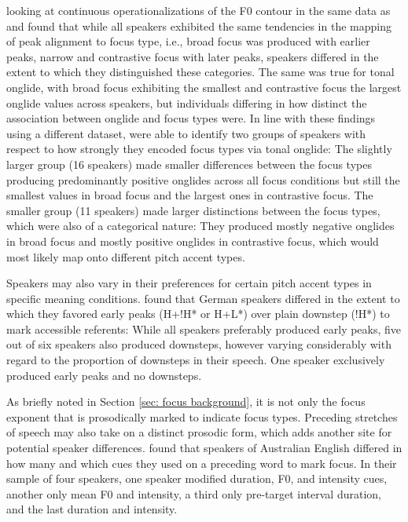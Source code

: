 \citet{griceIntegratingDiscretenessContinuity2017} looking at continuous operationalizations of the F0 contour in the same data as \citet{muckeEffectFocusMarking2014} and \citet{cangemiListenerSpecificPerceptionSpeakerSpecific2015} found that while all speakers exhibited the same tendencies in the mapping of peak alignment to focus type, i.e., broad focus was produced with earlier peaks, narrow and contrastive focus with later peaks, speakers differed in the extent to which they distinguished these categories. The same was true for tonal onglide, with broad focus exhibiting the smallest and contrastive focus the largest onglide values across speakers, but individuals differing in how distinct the association between onglide and focus types were. In line with these findings using a different dataset, \citet{roessigDynamicsIntonationCategorical2019} were able to identify two groups of speakers with respect to how strongly they encoded focus types via tonal onglide: The slightly larger group (16 speakers) made smaller differences between the focus types producing predominantly positive onglides across all focus conditions but still the smallest values in broad focus and the largest ones in contrastive focus. The smaller group (11 speakers) made larger distinctions between the focus types, which were also of a categorical nature: They produced mostly negative onglides in broad focus and mostly positive onglides in contrastive focus, which would most likely map onto different pitch accent types.

Speakers may also vary in their preferences for certain pitch accent types in specific meaning conditions. \citet{griceTonalAssociationDerived2009} found that German speakers differed in the extent to which they favored early peaks (H+!H* or H+L*) over plain downstep (!H*) to mark accessible referents: While all speakers preferably produced early peaks, five out of six speakers also produced downsteps, however varying considerably with regard to the proportion of downsteps in their speech. One speaker exclusively produced early peaks and no downsteps.

As briefly noted in Section \ref{sec: focus background}, it is not only the focus exponent that is prosodically marked to indicate focus types. Preceding stretches of speech may also take on a distinct prosodic form, which adds another site for potential speaker differences. \citet{ipSearchSalienceFocus2021} found that speakers of Australian English differed in how many and which cues they used on a preceding word to mark focus. In their sample of four speakers, one speaker modified duration, F0, and intensity cues, another only mean F0 and intensity, a third only pre-target interval duration, and the last duration and intensity.

